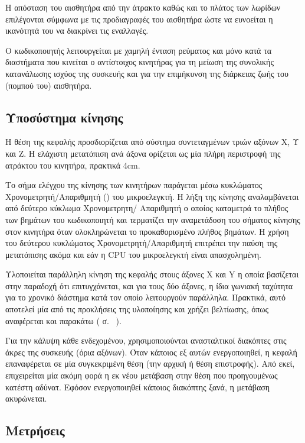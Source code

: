 Η απόσταση του αισθητήρα από την άτρακτο καθώς και το πλάτος των λωρίδων
επιλέγονται σύμφωνα με τις προδιαγραφές του αισθητήρα ώστε να ευνοείται η
ικανότητά του να διακρίνει τις εναλλαγές.

Ο κωδικοποιητής λειτουργείται με χαμηλή ένταση ρεύματος και μόνο κατά τα
διαστήματα που κινείται ο αντίστοιχος κινητήρας για τη μείωση της συνολικής
κατανάλωσης ισχύος της συσκευής και για την επιμήκυνση της διάρκειας ζωής του
(πομπού του) αισθητήρα.


\subsection{Υποσύστημα κίνησης}

Η θέση της κεφαλής προσδιορίζεται από σύστημα συντεταγμένων τριών αξόνων X, Υ
και Z. Η ελάχιστη μετατόπιση ανά άξονα ορίζεται ως μία πλήρη περιστροφή της
ατράκτου του κινητήρα, πρακτικά 4cm.

Το σήμα ελέγχου της κίνησης των κινητήρων παράγεται μέσω κυκλώματος
Χρονομετρητή\slash{}Απαριθμητή () του μικροελεγκτή.
Η λήξη της κίνησης αναλαμβάνεται από δεύτερο κύκλωμα Χρονομετρητη\slash{}%
Απαριθμητή ο οποίος καταμετρά το πλήθος των βημάτων του κωδικοποιητή και
τερματίζει την αναμετάδοση του σήματος κίνησης στον κινητήρα όταν ολοκληρώνεται
το προκαθορισμένο πλήθος βημάτων. Η χρήση του δεύτερου κυκλώματος
Χρονομετρητή\slash{}Απαριθμητή επιτρέπει την παύση της μετατόπισης ακόμα και εάν
η CPU του μικροελεγκτή είναι απασχολημένη.

Υλοποιείται παράλληλη κίνηση της κεφαλής στους άξονες X και Y η οποία βασίζεται
στην παραδοχή ότι επιτυγχάνεται, και για τους δύο άξονες, η ίδια γωνιακή
ταχύτητα για το χρονικό διάστημα κατά τον οποίο λειτουργούν παράλληλα. Πρακτικά,
αυτό αποτελεί μία από τις προκλήσεις της υλοποίησης και χρήζει βελτίωσης, όπως
αναφέρεται και παρακάτω ( σ.~%
\pageref{sec:improvements}).

Για την κάλυψη κάθε ενδεχομένου, χρησιμοποιούνται ανασταλτικοί διακόπτες στις
άκρες της συσκευής (όρια αξόνων). Όταν κάποιος εξ αυτών ενεργοποιηθεί, η κεφαλή
επαναφέρεται σε μία συγκεκριμένη θέση (την αρχική ή θέση επιστροφής). Από εκεί,
επιχειρείται μία ακόμη φορά η εκ νέου μετάβαση στην θέση που προηγουμένως
κατέστη αδύνατ. Εφόσον ενεργοποιηθεί κάποιος διακόπτης ξανά, η μετάβαση
ακυρώνεται.


\subsection{Μετρήσεις}

